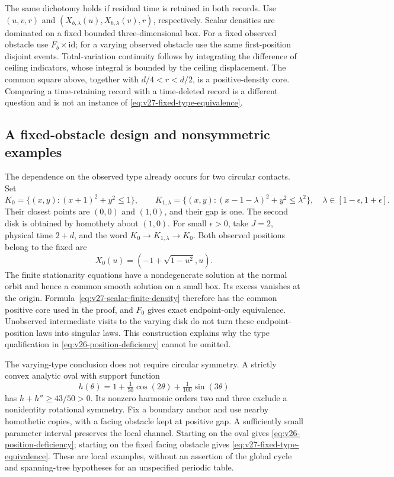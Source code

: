 \begin{remark}
\label{rem:v27-matched-time}
The same dichotomy holds if residual time is retained in both records.
Use \((u,v,r)\) and \((X_{b,\lambda}(u),X_{b,\lambda}(v),r)\),
respectively.  Scalar densities are dominated on a fixed bounded
three-dimensional box.  For a fixed observed obstacle use
\(F_b\times\mathrm{id}\); for a varying observed obstacle use the same
first-position disjoint events.  Total-variation continuity follows by
integrating the difference of ceiling indicators, whose integral is
bounded by the ceiling displacement.  The common square above, together
with \(d/4<r<d/2\), is a positive-density core.  Comparing a time-retaining
record with a time-deleted record is a different question and is not an
instance of \eqref{eq:v27-fixed-type-equivalence}.
\end{remark}

\subsection{A fixed-obstacle design and nonsymmetric examples}

The dependence on the observed type already occurs for two circular
contacts.  Set
\[
 K_0=\{(x,y):(x+1)^2+y^2\le1\},\qquad
 K_{1,\lambda}=\{(x,y):(x-1-\lambda)^2+y^2\le\lambda^2\},
 \quad \lambda\in[1-\epsilon,1+\epsilon].
\]
Their closest points are \((0,0)\) and \((1,0)\), and their gap is one.
The second disk is obtained by homothety about \((1,0)\).  For small
\(\epsilon>0\), take \(J=2\), physical time \(2+d\), and the word
\(K_0\longrightarrow K_{1,\lambda}\longrightarrow K_0\).  Both observed
positions belong to the fixed arc
\[
             X_0(u)=(-1+\sqrt{1-u^2},u).
\]
The finite stationarity equations have a nondegenerate solution at the
normal orbit and hence a common smooth solution on a small box.  Its
excess vanishes at the origin.  Formula~\eqref{eq:v27-scalar-finite-density}
therefore has the common positive core used in the proof, and \(F_0\)
gives exact endpoint-only equivalence.  Unobserved intermediate visits to
the varying disk do not turn these endpoint-position laws into singular
laws.  This construction explains why the type qualification in
\eqref{eq:v26-position-deficiency} cannot be omitted.

The varying-type conclusion does not require circular symmetry.  A
strictly convex analytic oval with support function
\[
 h(\theta)=1+\tfrac1{50}\cos(2\theta)+\tfrac1{100}\sin(3\theta)
\]
has \(h+h''\ge43/50>0\).  Its nonzero harmonic orders two and three
exclude a nonidentity rotational symmetry.  Fix a boundary anchor and use
nearby homothetic copies, with a facing obstacle kept at positive gap.
A sufficiently small parameter interval preserves the local channel.
Starting on the oval gives \eqref{eq:v26-position-deficiency}; starting on
the fixed facing obstacle gives \eqref{eq:v27-fixed-type-equivalence}.
These are local examples, without an assertion of the global cycle and
spanning-tree hypotheses for an unspecified periodic table.

